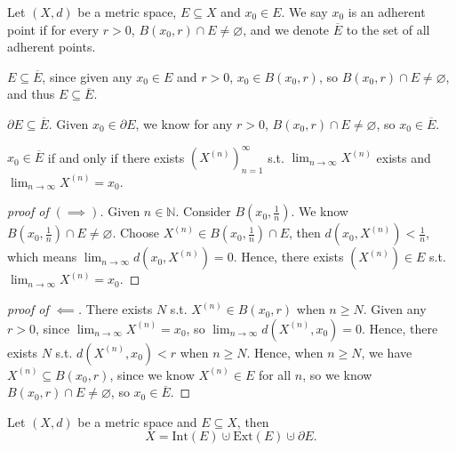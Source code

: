 \begin{definition}
    Let \((X,d)\) be a metric space, \(E \subseteq X\) and \(x_0 \in E\). We say \(x_0\) is an adherent point if for every \(r > 0\), \(B(x_0, r) \cap E \neq \varnothing \), and we denote \(\overline{E} \) to the set of all adherent points.      
\end{definition}
\vphantom{text}
\begin{remark}
    \(E \subseteq \overline{E} \), since given any \(x_0 \in E\) and \(r > 0\), \(x_0 \in B(x_0, r)\), so \(B(x_0, r) \cap E \neq \varnothing \), and thus \(E \subseteq \overline{E} \).      
\end{remark}
\begin{remark}
    \(\partial E \subseteq \overline{E} \). Given \(x_0 \in \partial E\), we know for any \(r > 0\), \(B(x_0, r) \cap E \neq \varnothing \), so \(x_0 \in \overline{E} \).    
\end{remark}
\begin{proposition}
    \(x_0 \in \overline{E} \) if and only if there exists \(\left( X^{(n)} \right)_{n=1}^{\infty}  \) s.t. \(\lim_{n \to \infty} X^{(n)} \) exists and \(\lim_{n \to \infty} X^{(n)} = x_0\).    
\end{proposition}
\begin{proof}[proof of \((\implies )\)]
    Given \(n \in \mathbb{N} \). Consider \(B\left( x_0, \frac{1}{n} \right) \). We know \(B\left( x_0, \frac{1}{n} \right) \cap E \neq \varnothing  \). Choose \(X^{(n)} \in B\left( x_0, \frac{1}{n} \right) \cap E \), then \(d\left( x_0, X^{(n)} \right) < \frac{1}{n} \), which means \(\lim_{n \to \infty} d\left( x_0, X^{(n)} \right) = 0  \). Hence, there exists \(\left( X^{(n)} \right) \in E \) s.t. \(\lim_{n \to \infty} X^{(n)} = x_0 \).     
\end{proof}
\begin{proof}[proof of \(\impliedby \)]
    There exists \(N\) s.t. \(X^{(n)} \in B(x_0, r)\) when \(n \ge N\). Given any \(r > 0\), since \(\lim_{n \to \infty} X^{(n)} = x_0 \), so \(\lim_{n \to \infty} d \left( X^{(n)}, x_0 \right) = 0  \). Hence, there exists \(N\) s.t. \(d\left( X^{(n)}, x_0 \right) < r \) when \(n \ge N\). Hence, when \(n \ge N\), we have \(X^{(n)}\subseteq B(x_0, r)\), since we know \(X^{(n)} \in E\) for all \(n\), so we know \(B(x_0, r) \cap E \neq \varnothing \), so \(x_0 \in \overline{E} \).               
\end{proof}

\begin{proposition}
    Let \((X, d)\) be a metric space and \(E \subseteq X\), then 
    \[
        X = \mathrm{Int}(E) \cupdot \mathrm{Ext}(E) \cupdot \partial E. 
    \]  
\end{proposition}


